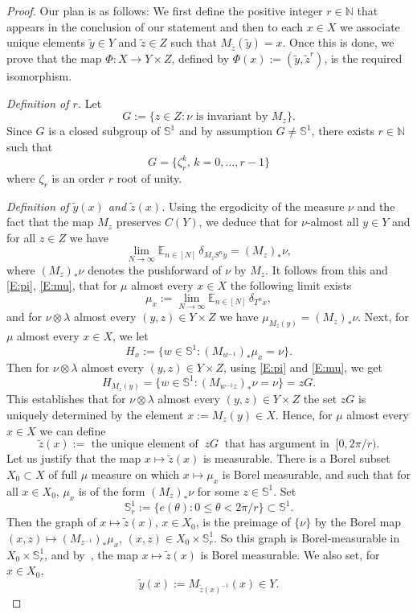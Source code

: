 \documentclass[11pt]{amsart}
\theoremstyle{definition}
\newcommand{\E}{{\mathbb E}}
\newcommand{\N}{{\mathbb N}}
\renewcommand{\S}{\mathbb{S}}
\begin{document}
\begin{proof}	
	Our plan is as follows: We  first define the positive integer  $r\in \N$  that appears in the conclusion of our statement and  then to each $x\in X$ we associate unique elements
	$\tilde{y}\in Y$ and $\tilde{z}\in Z$ such that $M_{\tilde{z}}(\tilde{y})=x$. Once this is done,  we prove that the map
	$\Phi\colon X\to Y\times Z$, defined by $\Phi(x):=(\tilde{y},\tilde{z}^r)$, is the required isomorphism.
	
	
	\smallskip
	
	{\em Definition of $r$.}   Let
	\begin{equation}\label{E:G}
		G := \{z\in Z\colon \nu\text{ is invariant by }M_z\}.
	\end{equation}
	Since $G$ is a closed subgroup of $\S^1$ and by assumption $G\neq \S^1$,
	there exists $r\in \N$ such that
	$$
	G=\{\zeta_r^k,\, k=0,\ldots, r-1\}
	$$
	where $\zeta_r$ is an order $r$ root of unity.
	\smallskip
	
	
	
	
	{\em Definition of $\tilde{y}(x)$ and  $\tilde{z}(x)$.}	 Using the ergodicity of the measure $\nu$ and the fact that the map $M_z$ preserves  $C(Y)$, we  deduce that for  $\nu$-almost all $y\in Y$ and  for all $z\in Z$  we have
	$$
	\lim_{N\to\infty} \E_{n\in[N]} \, \delta_{M_z S^n y} = (M_z)_\ast \nu,
	$$
	where $(M_z)_\ast \nu$ denotes the pushforward of $\nu$ by $M_z$. It follows
	from this and \eqref{E:pi}, \eqref{E:mu},
	that for $\mu$ almost every $x\in X$ the following limit exists
	$$
	\mu_x:=  \lim_{N\to\infty} \E_{n\in[N]} \, \delta_{T^nx},
	$$
	and for $\nu\otimes\lambda$ almost every $(y,z)\in Y\times Z$ we have $\mu_{M_z(y)} = (M_z)_\ast \nu$.
	Next, for $\mu$ almost every $x\in X$, we let
	$$
	H_x := \{w\in\S^1\colon (M_{w^{-1}})_\ast \mu_x = \nu\}.
	$$
	Then  for $\nu\otimes\lambda$ almost every $(y,z)\in Y\times Z$, using \eqref{E:pi} and \eqref{E:mu}, we get
	$$
	H_{M_z(y)} = \{w\in\S^1\colon (M_{w^{-1}z})_\ast \nu = \nu\} = zG.
	$$
	This establishes that for $\nu\otimes\lambda$ almost every $(y,z)\in Y\times Z$
	the set
	$zG$ is uniquely determined by  the element $x:=M_z(y)\in X$.
	Hence,  for $\mu$ almost every $x\in X$  we can define
	$$
	\tilde{z}(x):=  \text{  the unique element of } \ zG \  \text{ that has argument in } \ [0,2\pi/r).
	$$
	Let us justify that the map $x\mapsto \tilde{z}(x)$ is measurable. There is a Borel subset $X_0\subset X$ of full $\mu$ measure on which $x\mapsto \mu_x$ is Borel measurable, and such that for all $x\in X_0$, $\mu_x$ is of the form $(M_z)_\ast \nu$ for some $z\in\S^1$. Set
	$$
	\S^1_r := \{e(\theta):0\le\theta<2\pi/r\}\subset\S^1.
	$$
	Then the graph of $x\mapsto \tilde z(x)$, $x\in X_0$,  is the preimage of $\{\nu\}$ by the Borel map $(x,z)\mapsto (M_{z^{-1}})_\ast\mu_x$, $(x,z)\in X_0\times \S^1_r$. So this graph is Borel-measurable in $X_0\times \S^1_r$, and by~\cite[Theorem~14.12]{Ke12}, the map $x\mapsto\tilde z(x)$ is Borel measurable.
		We also set, for $x\in X_0$,
	$$
	\tilde y(x):= M_{\tilde z(x)^{-1}} (x) \in Y.
	$$


\end{proof}
\end{document}
